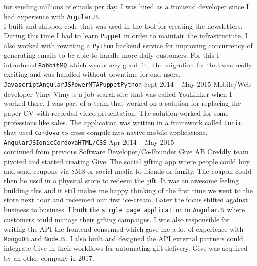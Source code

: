 \documentclass[9pt]{template} %
\begin{document}
\begin{entrylist}
{      for sending millions of emails per day. I was hired as a frontend developer
      since I had experience with \texttt{AngularJS}.\\ I built and shipped code
      that was used in the tool for creating the newsletters. During this time I
      had to learn \texttt{Puppet} in order to maintain the infrastructure.
      I also worked with rewriting a \texttt{Python} backend service for improving
      concurrency of generating emails to be able to handle more daily customers.
      For this I introduced \texttt{RabbitMQ} which was a very good fit.
      The migration for that was really exciting and was handled without downtime
      for end users.\\
      \texttt{Javascript}\slashsep\texttt{AngularJS}\slashsep\texttt{PowerMTA}\slashsep\texttt{Puppet}\slashsep\texttt{Python}}
  \entry
    {Sept 2014 -- May 2015}
    {Mobile/Web developer}
    {Vimy}
    {Vimy is a job search site that was called YouLinker when I worked there.
      I was part of a team that worked on a solution for replacing the paper CV
      with recorded video presentation. The solution worked for some professions like
      sales. The application was written in a framework called \texttt{Ionic} that
      used \texttt{Cardova} to cross compile into native mobile applications.\\
      \texttt{AngularJS}\slashsep\texttt{Ionic}\slashsep\texttt{Cordova}\slashsep\texttt{HTML/CSS}}
  \entry
    {Apr 2014 -- May 2015\\\footnotesize{continued from previous}}
    {Software Developer/Co-Founder}
    {Give AB}
    {Creddly team pivoted and started creating Give. The social gifting app where people
      could buy and send coupons via SMS or social media to friends or family.
      The coupon could then be used in a physical store to redeem the gift.
      It was an awesome feeling building this and it still makes me happy thinking of the
      first time we went to the store next door and redeemed our first ice-cream.
      Later the focus shifted against business to business.
      I built the \texttt{single page application} in \texttt{AngularJS} where customers
      could manage their gifting campaigns. I was also responsible for writing the API
      the frontend consumed which gave me a lot of experience with \texttt{MongoDB} and
      \texttt{NodeJS}. I also built and designed the API external partners could
      integrate Give in their workflows for automating gift delivery. Give was acquired
      by an other company in 2017.
}
\end{entrylist}
\end{document}
